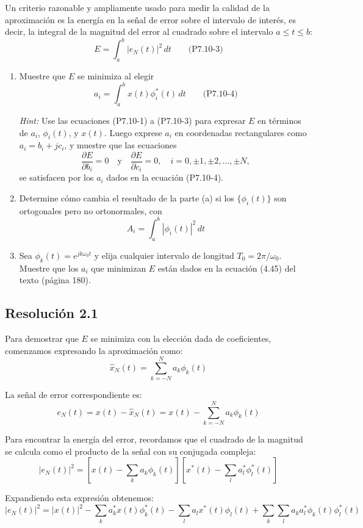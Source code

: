 \documentclass[
  11pt,
  letterpaper,
   addpoints,
   answers
  ]{exam}
\begin{document}
\begin{questions}
Un criterio razonable y ampliamente usado para medir la calidad de la aproximación es la energía en la señal de error sobre el intervalo de interés, es decir, la integral de la magnitud del error al cuadrado sobre el intervalo $a \leq t \leq b$:
$$E = \int_a^b |e_N(t)|^2 \, dt \qquad \text{(P7.10-3)}$$
\begin{enumerate}
  \item  Muestre que $E$ se minimiza al elegir $$a_i = \int_a^b x(t)\phi_i^*(t) \, dt \qquad \text{(P7.10-4)}$$

\textit{Hint:} Use las ecuaciones (P7.10-1) a (P7.10-3) para expresar $E$ en términos de $a_i$, $\phi_i(t)$, y $x(t)$. Luego exprese $a_i$ en coordenadas rectangulares como $a_i = b_i + jc_i$, y muestre que las ecuaciones
$$\frac{\partial E}{\partial b_i} = 0 \quad \text{y} \quad \frac{\partial E}{\partial c_i} = 0, \quad i = 0, \pm 1, \pm 2, \ldots, \pm N,$$
se satisfacen por los $a_i$ dados en la ecuación (P7.10-4).

\item Determine cómo cambia el resultado de la parte (a) si los $\{\phi_i(t)\}$ son ortogonales pero no ortonormales, con
$$A_i = \int_a^b |\phi_i(t)|^2 \, dt$$

\item Sea $\phi_k(t) = e^{jk\omega_0t}$ y elija cualquier intervalo de longitud $T_0 = 2\pi/\omega_0$. Muestre que los $a_i$ que minimizan $E$ están dados en la ecuación (4.45) del texto (página 180).
\end{enumerate}
\begin{solution}
\subsection*{Resolución 2.1}
Para demostrar que $E$ se minimiza con la elección dada de coeficientes, comenzamos expresando la aproximación como:
$$\hat{x}_N(t) = \sum_{k=-N}^{N} a_k\phi_k(t)$$

La señal de error correspondiente es:
$$e_N(t) = x(t) - \hat{x}_N(t) = x(t) - \sum_{k=-N}^{N} a_k\phi_k(t)$$

Para encontrar la energía del error, recordamos que el cuadrado de la magnitud se calcula como el producto de la señal con su conjugada compleja:
$$|e_N(t)|^2 = \left[x(t) - \sum_k a_k\phi_k(t)\right]\left[x^*(t) - \sum_l a_l^*\phi_l^*(t)\right]$$

Expandiendo esta expresión obtenemos:
$$|e_N(t)|^2 = |x(t)|^2 - \sum_k a_k^*x(t)\phi_k^*(t) - \sum_l a_l x^*(t)\phi_l(t) + \sum_k \sum_l a_k a_l^*\phi_k(t)\phi_l^*(t)$$


\end{solution}
\end{questions}
\end{document}
